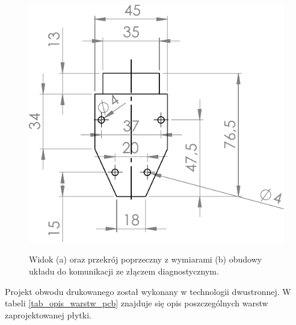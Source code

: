 \documentclass[12pt, twoside]{article} %
\numberwithin{equation}{subsection}
\numberwithin{figure}{section}
\numberwithin{table}{section}
\begin{document}
\begin{figure}[!h]
{				\includegraphics[scale=1]{Images/wymiary_wtyczka_obd.pdf}
			} 
			\caption{Widok (a) oraz przekrój poprzeczny z wymiarami (b) obudowy układu do komunikacji ze złączem diagnostycznym.}
			\label{widok_wtyczka_obd}
		\end{figure} 
	
	Projekt obwodu drukowanego został wykonany w technologii dwustronnej. W tabeli \ref{tab_opis_warstw_pcb} znajduje się opis poszczególnych warstw zaprojektowanej płytki.
	
\end{document}
